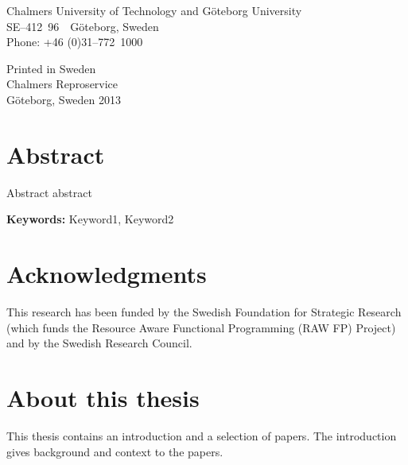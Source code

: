 \documentclass[a4paper]{book}
\newcommand{\uni}{Chalmers University of Technology and G\"oteborg University}
\begin{document}
\vspace{1cm} 

\noindent \uni \\
\noindent SE--412~96~~G\"oteborg, Sweden\\
\noindent Phone: +46 (0)31--772~1000 \\

\vspace{1cm} 

\noindent Printed in Sweden\\
\noindent Chalmers Reproservice\\
\noindent G\"oteborg, Sweden 2013


\thispagestyle{empty}

\clearpage
{}

\section*{Abstract}
Abstract abstract 

\vspace{5mm}

\noindent

 \textbf{Keywords:} Keyword1, Keyword2  

\clearpage

\section*{Acknowledgments}


\vspace{5mm}
This research has been funded by the Swedish Foundation for
Strategic Research (which funds the Resource Aware Functional 
Programming (RAW FP) Project) and by the Swedish Research Council.

\clearpage

\section*{About this thesis} 

This thesis contains an introduction and a selection of papers. The introduction 
gives background and context to the papers. 
\end{document}
